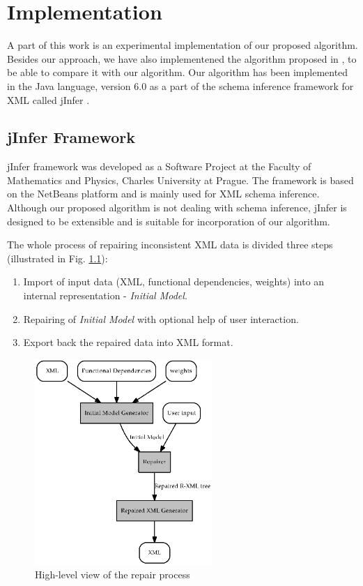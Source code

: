 \chapter{Implementation}

A part of this work is an experimental implementation of our proposed algorithm. Besides our approach, we have also implementened the algorithm proposed in \cite{RepAndConsistentAnswer}, to be able to compare it with our algorithm. Our algorithm has been implemented in the Java language, version 6.0 as a part of the schema inference framework for XML called jInfer \cite{jinfer}.

\section{jInfer Framework}

jInfer framework was developed as a Software Project at the Faculty of Mathematics and Physics, Charles University at Prague. The framework is based on the NetBeans platform and is mainly used for XML schema inference. Although our proposed algorithm is not dealing with schema inference, jInfer is designed to be extensible and is suitable for incorporation of our algorithm.

The whole process of repairing inconsistent XML data is divided three steps (illustrated in Fig. \ref{repairProcess}):

\begin{enumerate}
	\item Import of input data (XML, functional dependencies, weights) into an internal representation - \emph{Initial Model}.
    \item Repairing of \emph{Initial Model} with optional help of user interaction.
    \item Export back the repaired data into XML format.
\end{enumerate}

\begin{figure}[H]
    \centering\includegraphics[width=0.6\textwidth]{repair_process}
    \caption{High-level view of the repair process}
    \label{repairProcess}
\end{figure}

